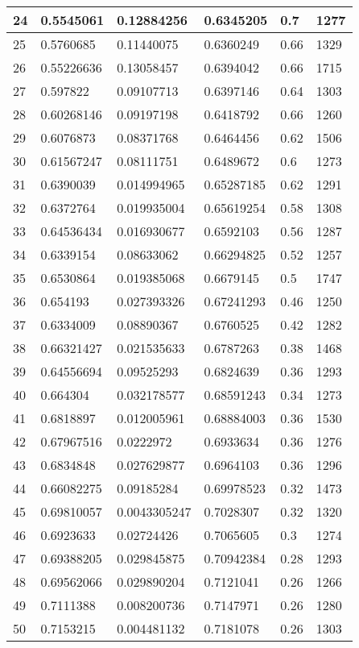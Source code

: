 \begin{longtable}{|l|l|l|l|l|l|}
24 & 0.5545061 & 0.12884256 & 0.6345205 & 0.7 & 1277 \\ \hline 
25 & 0.5760685 & 0.11440075 & 0.6360249 & 0.66 & 1329 \\ \hline 
26 & 0.55226636 & 0.13058457 & 0.6394042 & 0.66 & 1715 \\ \hline 
27 & 0.597822 & 0.09107713 & 0.6397146 & 0.64 & 1303 \\ \hline 
28 & 0.60268146 & 0.09197198 & 0.6418792 & 0.66 & 1260 \\ \hline 
29 & 0.6076873 & 0.08371768 & 0.6464456 & 0.62 & 1506 \\ \hline 
30 & 0.61567247 & 0.08111751 & 0.6489672 & 0.6 & 1273 \\ \hline 
31 & 0.6390039 & 0.014994965 & 0.65287185 & 0.62 & 1291 \\ \hline 
32 & 0.6372764 & 0.019935004 & 0.65619254 & 0.58 & 1308 \\ \hline 
33 & 0.64536434 & 0.016930677 & 0.6592103 & 0.56 & 1287 \\ \hline 
34 & 0.6339154 & 0.08633062 & 0.66294825 & 0.52 & 1257 \\ \hline 
35 & 0.6530864 & 0.019385068 & 0.6679145 & 0.5 & 1747 \\ \hline 
36 & 0.654193 & 0.027393326 & 0.67241293 & 0.46 & 1250 \\ \hline 
37 & 0.6334009 & 0.08890367 & 0.6760525 & 0.42 & 1282 \\ \hline 
38 & 0.66321427 & 0.021535633 & 0.6787263 & 0.38 & 1468 \\ \hline 
39 & 0.64556694 & 0.09525293 & 0.6824639 & 0.36 & 1293 \\ \hline 
40 & 0.664304 & 0.032178577 & 0.68591243 & 0.34 & 1273 \\ \hline 
41 & 0.6818897 & 0.012005961 & 0.68884003 & 0.36 & 1530 \\ \hline 
42 & 0.67967516 & 0.0222972 & 0.6933634 & 0.36 & 1276 \\ \hline 
43 & 0.6834848 & 0.027629877 & 0.6964103 & 0.36 & 1296 \\ \hline 
44 & 0.66082275 & 0.09185284 & 0.69978523 & 0.32 & 1473 \\ \hline 
45 & 0.69810057 & 0.0043305247 & 0.7028307 & 0.32 & 1320 \\ \hline 
46 & 0.6923633 & 0.02724426 & 0.7065605 & 0.3 & 1274 \\ \hline 
47 & 0.69388205 & 0.029845875 & 0.70942384 & 0.28 & 1293 \\ \hline 
48 & 0.69562066 & 0.029890204 & 0.7121041 & 0.26 & 1266 \\ \hline 
49 & 0.7111388 & 0.008200736 & 0.7147971 & 0.26 & 1280 \\ \hline 
50 & 0.7153215 & 0.004481132 & 0.7181078 & 0.26 & 1303 \\ \hline 
\end{longtable}
